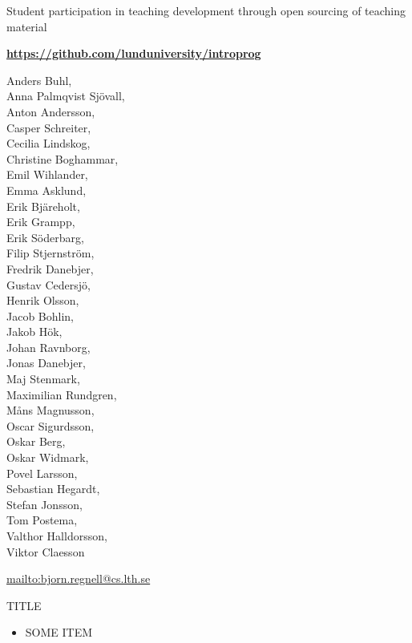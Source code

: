 \documentclass{lecturenotes}
\begin{document}
\begin{Slide}{Student participation in teaching development through open sourcing of teaching material}

{\large\textbf{\url{https://github.com/lunduniversity/introprog}}}

\begin{multicols}{3}\footnotesize
Anders Buhl, \\Anna Palmqvist Sjövall, \\Anton Andersson, \\Casper Schreiter, \\Cecilia Lindskog, \\Christine Boghammar, \\Emil Wihlander, \\Emma Asklund, \\Erik Bjäreholt, \\Erik Grampp, \\Erik Söderbarg, \\Filip Stjernström, \\Fredrik Danebjer, \\Gustav Cedersjö, \\Henrik Olsson, \\Jacob Bohlin, \\Jakob Hök, \\Johan Ravnborg, \\Jonas Danebjer, \\Maj Stenmark, \\Maximilian Rundgren, \\Måns Magnusson, \\Oscar Sigurdsson, \\Oskar Berg, \\Oskar Widmark, \\Povel Larsson, \\Sebastian Hegardt, \\Stefan Jonsson, \\Tom Postema, \\Valthor Halldorsson, \\Viktor Claesson
\end{multicols}

 {\footnotesize\url{mailto:bjorn.regnell@cs.lth.se}}
\end{Slide}



\begin{Slide}{TITLE}
\begin{itemize}
\item SOME ITEM
\end{itemize}
\end{Slide}
\end{document}
